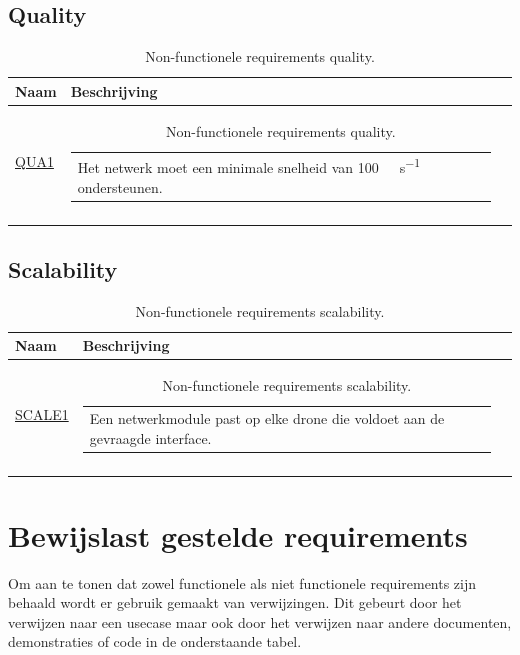 \documentclass[a4paper, 11pt, oneside]{report}
\begin{document}
\section{Quality}

\begin{longtable}{|l|l|l|}
	\hline
	\rowcolor[HTML]{C0C0C0} 
	Naam & Beschrijving \\ \hline
	\endhead
	\hyperlink{QUA1}{QUA1}			&\begin{tabular}[c]{@{}l@{}} Het netwerk moet een minimale snelheid van \SI{100}{\kilo\bit\per\second} ondersteunen. \end{tabular}\\ \hline
	\caption{Non-functionele requirements quality.}
	\label{tab:nietfunctionelecriteria:quality}
\end{longtable}

\section{Scalability}

\begin{longtable}{|l|l|l|}
	\hline
	\rowcolor[HTML]{C0C0C0} 
	Naam & Beschrijving \\ \hline
	\endhead
	\hyperlink{SCALE1}{SCALE1}			&\begin{tabular}[c]{@{}l@{}} Een netwerkmodule past op elke drone die voldoet aan de gevraagde interface.	\end{tabular}\\ \hline
	\caption{Non-functionele requirements scalability.}
	\label{tab:nietfunctionelecriteria:scalability}
\end{longtable}

\chapter{Bewijslast gestelde requirements}
Om aan te tonen dat zowel functionele als niet functionele requirements zijn behaald wordt er gebruik gemaakt van verwijzingen. Dit gebeurt door het verwijzen naar een usecase maar ook door het verwijzen naar andere documenten, demonstraties of code in de onderstaande tabel.
\end{document}
